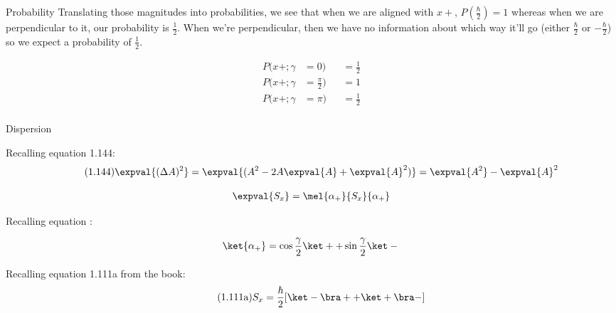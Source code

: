 \begin{answer}
\begin{answerpart}{Probability}
  Translating those magnitudes into probabilities, we see that when we
  are aligned with $x+$, $P(\frac{\hbar}{2}) = 1$ whereas when we are
  perpendicular to it, our probability is $\frac 1 2$.  When we're
  perpendicular, then we have no information about which way it'll go
  (either $\frac \hbar 2$ or $- \frac \hbar 2$) so we expect a
  probability of $\frac 1 2$.

  \begin{equation}
    \begin{alignedat}{2}
      P(x+;\gamma&=0) & &= \frac 1 2\\
      P(x+;\gamma&=\frac{\pi}{2}) & &= 1\\
      P(x+;\gamma&=\pi) & &= \frac 1 2\\
    \end{alignedat}
  \end{equation}

  \end{answerpart}

  \begin{answerpart}{Dispersion}

    Recalling equation 1.144:
    \begin{equation*}
      \tag{1.144}
      \expval{(\Delta A)^2}
      = \expval{(A^2 - 2A\expval{A} + \expval{A}^2)}
      = \expval{A^2} - \expval{A}^2
    \end{equation*}

    \begin{equation}
      \begin{split}
        \expval{S_x}
        &= \mel{\alpha_+}{S_x}{\alpha_+}\\
      \end{split}
    \end{equation}

    Recalling equation :

    \begin{equation}
      \ket{\alpha_+}
      = \cos{\frac{\gamma}{2}} \ket +
      + \sin{\frac{\gamma}{2}} \ket -\\
    \end{equation}
    
    Recalling equation 1.111a from the book:
    \begin{equation*}
      \tag{1.111a}
      S_x = \frac{\hbar}{2} [\ket - \bra + + \ket + \bra - ]
    \end{equation*}


\end{answerpart}
\end{answer}
